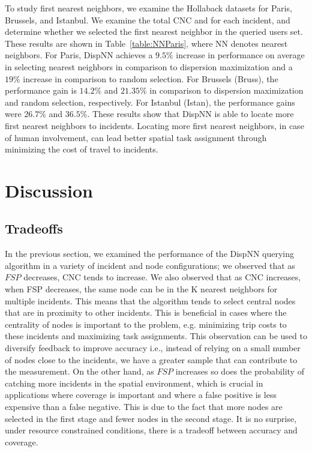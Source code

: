 \documentclass{acm_proc_article-sp}
\begin{document}
To study first nearest neighbors, we examine the Hollaback datasets for Paris, Brussels, and Istanbul. We examine the total CNC and for each incident, and determine whether we selected the first nearest neighbor in the queried users set. These results are shown in Table~\ref{table:NNParis}, where NN denotes nearest neighbors. For Paris, DispNN achieves a $9.5\%$ increase in performance on average in selecting nearest neighbors in comparison to dispersion maximization and a $19\%$ increase in comparison to random selection. For Brussels (Bruss), the performance gain is $14.2\%$ and $21.35\%$ in comparison to dispersion maximization and random selection, respectively. For Istanbul (Istan), the performance gains were $26.7\%$ and $36.5\%$. These results show that DispNN is able to locate more first nearest neighbors to incidents. Locating more first nearest neighbors, in case of human involvement, can lead better spatial task assignment through minimizing the cost of travel to incidents. 
\section{Discussion}
\subsection{Tradeoffs}
In the previous section, we examined the performance of the DispNN querying algorithm in a variety of incident and node configurations; we observed that as $FSP$ decreases, CNC tends to increase. We also observed that as CNC increases, when FSP decreases, the same node can be in the K nearest neighbors for multiple incidents. This means that the algorithm tends to select central nodes that are in proximity to other incidents. This is beneficial in cases where the centrality of nodes is important to the problem, e.g. minimizing trip costs to these incidents and maximizing task assignments. This observation can be used to diversify feedback to improve accuracy i.e., instead of relying on a small number of nodes close to the incidents, we have a greater sample that can contribute to the measurement.
On the other hand, as $FSP$ increases so does the probability of catching more incidents in the spatial environment, which is crucial in applications where coverage is important and where a false positive is less expensive than a false negative. This is due to the fact that more nodes are selected in the first stage and fewer nodes in the second stage. It is no surprise, under resource constrained conditions, there is a tradeoff between accuracy and coverage.
\end{document}
